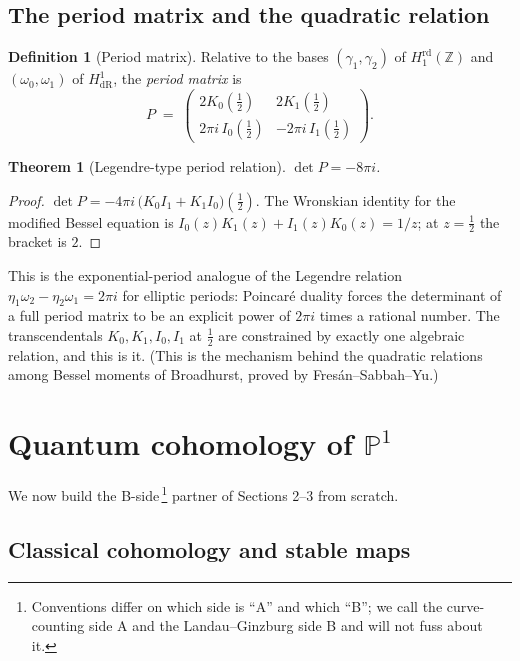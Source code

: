 \documentclass[11pt]{article}
\newtheorem{theorem}[proposition]{Theorem}
\theoremstyle{definition}
\newtheorem{definition}[proposition]{Definition}
\theoremstyle{remark}
\newcommand{\Z}{\mathbb{Z}}
\newcommand{\PP}{\mathbb{P}}
\newcommand{\dR}{\mathrm{dR}}
\newcommand{\rd}{\mathrm{rd}}
\begin{document}
\subsection{The period matrix and the quadratic relation}

\begin{definition}[Period matrix]
Relative to the bases $(\gamma_1, \gamma_2)$ of $H_1^{\rd}(\Z)$ and
$(\omega_0, \omega_1)$ of $H^1_{\dR}$, the \emph{period matrix} is
\[
  P \;=\;
  \begin{pmatrix}
    2K_0(\tfrac12) & 2K_1(\tfrac12) \\[2pt]
    2\pi i\, I_0(\tfrac12) & -2\pi i\, I_1(\tfrac12)
  \end{pmatrix}.
\]
\end{definition}

\begin{theorem}[Legendre-type period relation]\label{thm:legendre}
$\det P = -8\pi i$.
\end{theorem}

\begin{proof}
$\det P = -4\pi i\,\bigl(K_0 I_1 + K_1 I_0\bigr)(\tfrac12)$. The
Wronskian identity for the modified Bessel equation is
$I_0(z)K_1(z) + I_1(z)K_0(z) = 1/z$; at $z = \tfrac12$ the bracket
is $2$.
\end{proof}

This is the exponential-period analogue of the Legendre relation
$\eta_1\omega_2 - \eta_2\omega_1 = 2\pi i$ for elliptic periods:
Poincar\'e duality forces the determinant of a full period matrix
to be an explicit power of $2\pi i$ times a rational number. The
transcendentals $K_0, K_1, I_0, I_1$ at $\tfrac12$ are constrained
by exactly one algebraic relation, and this is it. (This is the
mechanism behind the quadratic relations among Bessel moments of
Broadhurst, proved by Fres\'an--Sabbah--Yu.)

\section{Quantum cohomology of $\PP^1$}

We now build the B-side\,\footnote{Conventions differ on which side
is ``A'' and which ``B''; we call the curve-counting side A and the
Landau--Ginzburg side B and will not fuss about it.} partner of
Sections 2--3 from scratch.

\subsection{Classical cohomology and stable maps}
\end{document}
